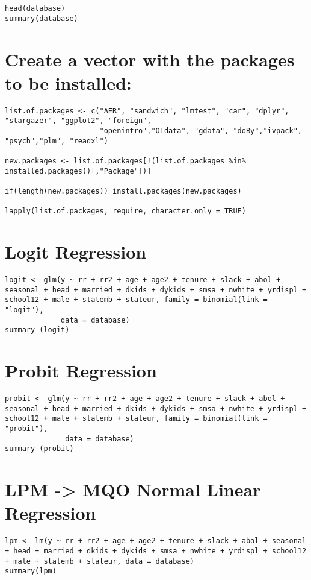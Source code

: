 \documentclass[]{article}
\begin{document}
\begin{verbatim}
head(database)
summary(database)
\end{verbatim}

\section{Create a vector with the packages to be
installed:}\label{create-a-vector-with-the-packages-to-be-installed}

\begin{verbatim}
list.of.packages <- c("AER", "sandwich", "lmtest", "car", "dplyr", "stargazer", "ggplot2", "foreign",
                      "openintro","OIdata", "gdata", "doBy","ivpack", "psych","plm", "readxl")

new.packages <- list.of.packages[!(list.of.packages %in% installed.packages()[,"Package"])]

if(length(new.packages)) install.packages(new.packages)

lapply(list.of.packages, require, character.only = TRUE)
\end{verbatim}

\section{Logit Regression}\label{logit-regression}

\begin{verbatim}
logit <- glm(y ~ rr + rr2 + age + age2 + tenure + slack + abol + seasonal + head + married + dkids + dykids + smsa + nwhite + yrdispl + school12 + male + statemb + stateur, family = binomial(link = "logit"), 
             data = database)
summary (logit)
\end{verbatim}

\section{Probit Regression}\label{probit-regression}

\begin{verbatim}
probit <- glm(y ~ rr + rr2 + age + age2 + tenure + slack + abol + seasonal + head + married + dkids + dykids + smsa + nwhite + yrdispl + school12 + male + statemb + stateur, family = binomial(link = "probit"), 
              data = database)
summary (probit)
\end{verbatim}

\section{LPM -\textgreater{} MQO Normal Linear
Regression}\label{lpm---mqo-normal-linear-regression}

\begin{verbatim}
lpm <- lm(y ~ rr + rr2 + age + age2 + tenure + slack + abol + seasonal + head + married + dkids + dykids + smsa + nwhite + yrdispl + school12 + male + statemb + stateur, data = database)
summary(lpm)
\end{verbatim}
\end{document}
